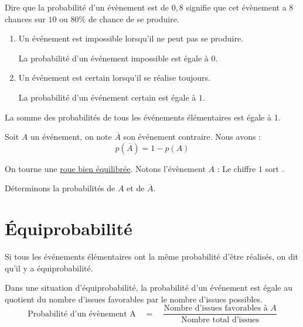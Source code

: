 \documentclass[a4paper,10pt]{report}
\begin{document}
\begin{ex}
Dire que la probabilité d'un évènement est de $0,8$ signifie que cet évènement a $8$ chances sur $10$ ou $80 \%$ de chance de se produire.
\end{ex}

\begin{rem}
\begin{enumerate}
\item[•] Un événement est impossible lorsqu'il ne peut pas se produire.

\noindent La probabilité d'un événement impossible est égale à $0$.
\item[•] Un événement est certain lorsqu'il se réalise toujours.

\noindent La probabilité d'un événement certain est égale à $1$.
\end{enumerate}
\end{rem}

\begin{prop}
La somme des probabilités de tous les événements élémentaires est égale à 1.
\end{prop}

\begin{prop}
Soit $A$ un événement, on note $\overline{A}$ son événement contraire. Nous avons : $$p(\overline{A}) = 1 - p(A)$$
\end{prop}

\begin{ex}
On tourne une \href{https://fr.piliapp.com/random/wheel/}{roue bien équilibrée}. Notons l'évènement $A$ : \og Le chiffre $1$ sort \fg{}. 

\noindent Déterminons la probabilités de $A$ et de $\overline{A}$.

\medskip \noindent\grandscarreaux{\linewidth}{3.2cm}
\end{ex}

\section{Équiprobabilité}

\begin{defn}
Si tous les événements élémentaires ont la même probabilité d'être réalisés, on dit qu'il y a équiprobabilité.
\end{defn}

\begin{prop}
Dans une situation d'équiprobabilité, la probabilité d'un événement est égale au quotient du nombre d'issues favorables par le nombre d'issues possibles.
$$\textrm{Probabilité d'un évènement A} \quad = \quad \dfrac{\textrm{Nombre d'issues favorables à }A}{\textrm{Nombre total d'issues}}$$
\end{prop}
\end{document}
